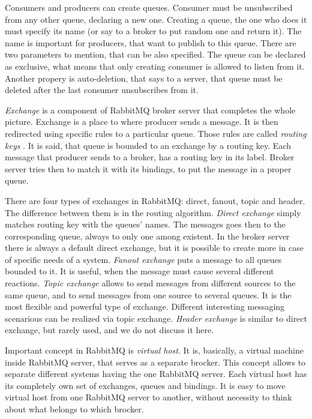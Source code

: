 Consumers and producers can create queues.
Consumer must be unsubscribed from any other queue, declaring a new one.
Creating a queue, the one who does it must specify its name (or say to a broker to put random one and return it).
The name is important for producers, that want to publish to this queue.
There are two parameters to mention, that can be also specified.
The queue can be declared as exclusive, what means that only creating consumer is allowed to listen from it.
Another propery is auto-deletion, that says to a server, that queue must be deleted after the last consumer unsubscribes from it.

\textit{Exchange}  is a component of RabbitMQ broker server that completes the whole picture.
Exchange is a place to where producer sends a message.
It is then redirected using specific rules to a particular queue.
Those rules are called \textit{routing keys} .
It is said, that queue is bounded to an exchange by a routing key.
Each message that producer sends to a broker, has a routing key in its label.
Broker server tries then to match it with its bindings, to put the message in a proper queue.

There are four types of exchanges in RabbitMQ: direct, fanout, topic and header.
The difference between them is in the routing algorithm.
\textit{Direct exchange} simply matches routing key with the queues' names.
The messages goes then to the corresponding queue, always to only one among existent.
In the broker server there is always a default direct exchange, but it is possible to create more in case of specific needs of a system.
\textit{Fanout exchange} puts a message to all queues bounded to it.
It is useful, when the message must cause several different reactions.
\textit{Topic exchange} allows to send messages from different sources to the same queue, and to send messages from one source to several queues.
It is the most flexible and powerful type of exchange.
Different interesting messaging scenarious can be realized via topic exchange.
\textit{Header exchange} is similar to direct exchange, but rarely used, and we do not discuss it here.

Important concept in RabbitMQ is \textit{virtual host}.
It is, basically, a virtual machine inside RabbitMQ server, that serves as a separate brocker.
This concept allows to separate different systems having the one RabbitMQ server.
Each virtual host has its completely own set of exchanges, queues and bindings.
It is easy to move virtual host from one RabbitMQ server to another, without necessity to think about what belongs to which brocker.

